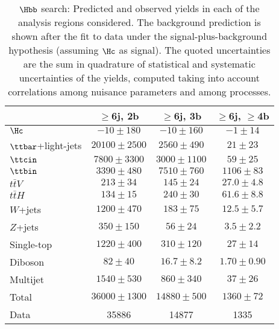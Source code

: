 \begin{table}[htbp]
\begin{center}
\begin{tabular}{l*{3}{c}}
\hline\hline
 & $\geq$6j, 2b & $\geq$6j, 3b & $\geq$6j, $\geq$4b \\
\hline
$\Hc$  &   $ -10 \pm 180 $ &   $ -10 \pm 160 $ &   $ -1 \pm 14 $ \\ 
\hline
$\ttbar$+light-jets  &   $ 20100 \pm 2500 $ &   $ 2560 \pm 490 $ &   $ 21 \pm 23 $ \\ 
$\ttcin$  &   $ 7800 \pm 3300 $ &   $ 3000 \pm 1100 $ &   $ 59 \pm 25 $ \\ 
$\ttbin$  &   $ 3390 \pm 480 $ &   $ 7510 \pm 760 $ &   $ 1106 \pm 83 $ \\ 
$t\bar{t}V$  &   $ 213 \pm 34 $ &   $ 145 \pm 24 $ &   $ 27.0 \pm 4.8 $ \\ 
$t\bar{t}H$  &   $ 134 \pm 15 $ &   $ 240 \pm 30 $ &   $ 61.6 \pm 8.8 $ \\ 
$W$+jets  &   $ 1200 \pm 470 $ &   $ 183 \pm 75 $ &   $ 12.5 \pm 5.7 $ \\ 
$Z$+jets  &   $ 350 \pm 150 $ &   $ 56 \pm 24 $ &   $ 3.5 \pm 2.2 $ \\ 
Single-top  &   $ 1220 \pm 400 $ &   $ 310 \pm 120 $ &   $ 27 \pm 14 $ \\ 
Diboson  &   $ 82 \pm 40 $ &   $ 16.7 \pm 8.2 $ &   $ 1.70 \pm 0.90 $ \\ 
Multijet  &   $ 1540 \pm 530 $ &   $ 860 \pm 340 $ &   $ 37 \pm 26 $ \\ 
\hline
Total &   $ 36000 \pm 1300 $ &   $ 14880 \pm 500 $ &   $ 1360 \pm 72 $ \\ 
\hline
Data & 35886  & 14877  & 1335  \\
\hline\hline      
\end{tabular}

%
\end{center}
\caption{
$\Hbb$ search: Predicted and observed yields in each of the analysis regions considered.
The background prediction is shown after the fit to data under the signal-plus-background hypothesis 
(assuming $\Hc$ as signal).
The quoted uncertainties are the sum in quadrature of statistical and systematic uncertainties of the yields, 
computed taking into account correlations among nuisance parameters and among processes.
}
\label{tab:Hbb_Postfit_Yields_Unblind_Hc}
\end{table}

